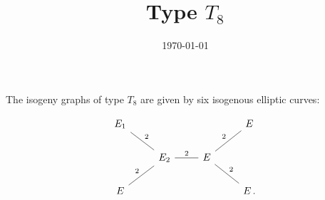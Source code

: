 \documentclass[11pt]{article}
\theoremstyle{definition}
\begin{document}
\title{Type $T_8$}
\date{\today}
\maketitle
The isogeny graphs of type $T_8$ are given by
six isogenous elliptic curves:

\[ \begin{tikzcd}
E_1 \ar[dash,dr,"2"] & & & E\\
& E_2 \ar[dash,r,"2"] & E  \ar[dash,ur,"2"]  \ar[dash,dr,"2"]& \\
E    \ar[dash,ur,"2"] &  &  & E    \,.
\end{tikzcd}
\]
 

\begin{comment}
\noindent A hauptmodul for $X_0(8)$ is  
$$
t = 2^8 \displaystyle{\left(\frac{\eta(4\tau)}{\eta(\tau)}\right)^8}\,.
$$
One has
$$
\begin{tblr}{l@{\,=\,}l}
j_1= j(E_1) = j(\tau) & 
t^{-1} \cdot (t + 16)^{-1} \cdot (t^{2} + 16 t + 16)^{3}\\
j_2 = j(E_2) = j(2\tau) & 
t^{-2} \cdot (t + 16)^{-2} \cdot (t^{2} + 16 t + 256)^{3}
\\
j_4 = j(E_4) = j(4\tau) & 
t^{-4} \cdot (t + 16)^{-1} \cdot (t^{2} + 256 t + 4096)^{3}\\
j_{12} = j(E_{12}) = j(\tau+1/2) & 
\left(-1\right) \cdot (t + 16)^{-4} \cdot t^{-1} \cdot (t^{2} - 224 t + 256)^{3}\,,
\end{tblr}
$$
and the subgroup of $\operatorname{Aut} X_0(4)$ that fixes the set of vertices of the graph is
isomorphic to the symmetric group $\mathcal{S}_3$ with elements:


$$
\begin{tblr}{l@{\,=\,}lcc}
    \SetCell[c=3]{r} \text{permutation} & & & \text{order}  \\
   \operatorname{id}(t) & t  &  (j_1,j_2,j_4,j_{12}) & 1 \\
   \sigma(t) & -256/(t+16) & (j_{12},j_2,j_1,j_4) & 3 \\
   \sigma^2(t) & -16(t+16)/t & (j_4,j_2,j_{12},j_1) & 3 \\ 
   \tau(t) & 256/t & (j_4,j_2,j_4,j_{12}) & 2 \\
   \sigma \tau(t) & -(t+16) &   (j_1,j_2,j_4,j_{12})               & 2 \\
   \sigma^2 \tau(t) & -16\, t/(t+16) &  (j_{12},j_2,j_4,j_1)                 & 2 \\
\end{tblr}
$$
\end{comment}
\end{document}
